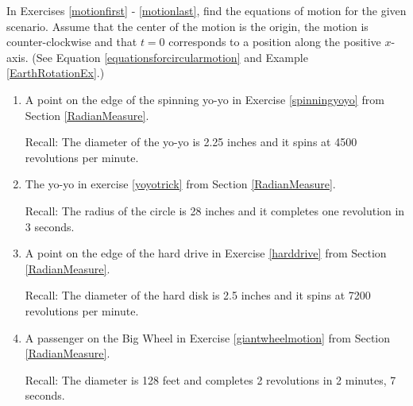 In Exercises \ref{motionfirst} - \ref{motionlast}, find the equations of motion for the given scenario.  Assume that the center of the motion is the origin, the motion is counter-clockwise and that $t = 0$ corresponds to a position along the positive $x$-axis.  (See Equation \ref{equationsforcircularmotion} and Example \ref{EarthRotationEx}.)

\begin{enumerate}

\setcounter{enumi}{\value{HW}}

\item  \label{motionfirst} A point on the edge of the spinning yo-yo in Exercise \ref{spinningyoyo} from Section \ref{RadianMeasure}. 

Recall: The diameter of the yo-yo is 2.25 inches and it spins at 4500 revolutions per minute.

\item  The yo-yo in exercise \ref{yoyotrick} from Section \ref{RadianMeasure}.

Recall: The radius of the circle is 28 inches and it completes one revolution in 3 seconds.

\item A point on the edge of the hard drive in Exercise \ref{harddrive} from Section \ref{RadianMeasure}.

Recall:  The diameter of the hard disk is 2.5 inches and it spins at 7200 revolutions per minute.

\item  \label{motionlast} A passenger on the Big Wheel in Exercise \ref{giantwheelmotion} from Section \ref{RadianMeasure}.

Recall: The diameter is 128 feet and completes 2 revolutions in 2 minutes, 7 seconds.

\setcounter{HW}{\value{enumi}}

\end{enumerate}

